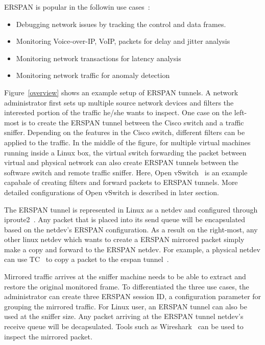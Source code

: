 \documentclass{sigplanconf}
\begin{document}
ERSPAN is popular in the followin use cases~\cite{erspan_ietf}:
\begin{itemize}
\item Debugging network issues by tracking the control and data frames. 
\item Monitoring Voice-over-IP, VoIP, packets for delay and jitter analysis
\item Monitoring network transactions for latency analysis
\item Monitoring network traffic for anomaly detection
\end{itemize}
Figure~\ref{overview} shows an example setup of ERSPAN tunnels.
A network administrator first sets up multiple source network devices
and filters the interested portion of the traffic he/she wants
to inspect.  One case on the left-most is to create the ERSPAN tunnel
between the Cisco switch and a traffic sniffer.  Depending on the
features in the Cisco switch, different filters can be applied to the
traffic.  In the middle of the figure, for multiple virtual machines running
inside a Linux box, the virtual switch forwarding the packet between
virtual and physical network can also create ERSPAN tunnels between
the software switch and remote traffic sniffer.
Here, Open vSwitch~\cite{ovs} is an example capabale of creating filters
and forward packets to ERSPAN tunnels. More detailed configurations of
Open vSwitch is described in later section. 

The ERSPAN tunnel is represented in Linux as a netdev and configured
through iproute2~\cite{iproute2}. Any packet that is placed into its send
queue will be encapsulated based on the netdev's ERSPAN configuration.  
As a result on the right-most, any other linux netdev which wants to create
a ERSPAN mirrored packet simply make a copy and forward to the ERSPAN netdev.
For example, a physical netdev can use TC~\cite{tc} to copy a packet
to the erspan tunnel~\cite{tcselftest}.

Mirrored traffic arrives at the sniffer machine needs to be able to
extract and restore the original monitored frame.  To differentiated
the three use cases, the administrator can create three ERSPAN session
ID, a configuration parameter for grouping the mirrored traffic.
For Linux user, an ERSPAN tunnel can also be used at the sniffer size.
Any packet arriving at the ERSPAN tunnel netdev's receive queue will
be decapsulated. Tools such as Wireshark~\cite{wireshark} can be used
to inspect the mirrored packet.
\end{document}
